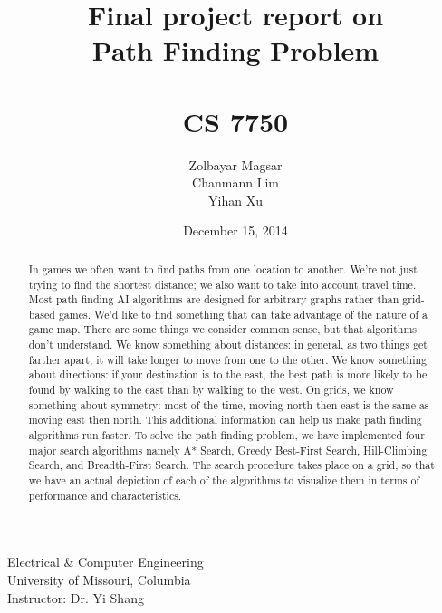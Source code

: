 \documentclass[a4paper]{article}
\title{Final project report on \\Path Finding Problem \\~ \\ CS 7750} %
\author{Zolbayar Magsar \\Chanmann Lim \\Yihan Xu}
\date{December 15, 2014}
\begin{document}
\maketitle %

\lstset{language=Java,title=\lstname,basicstyle=\footnotesize}

\begin{center}
Electrical \& Computer Engineering \\
University of Missouri, Columbia \\
\vspace{.5 in}
Instructor: Dr. Yi Shang \\
\end{center}

\vspace{1 in}

\begin{abstract}
In games we often want to find paths from one location to another. We’re not just trying to find the shortest distance; we also want to take into account travel time. Most path finding AI algorithms are designed for arbitrary graphs rather than grid-based games. We’d like to find something that can take advantage of the nature of a game map. There are some things we consider common sense, but that algorithms don’t understand. We know something about distances: in general, as two things get farther apart, it will take longer to move from one to the other. We know something about directions: if your destination is to the east, the best path is more likely to be found by walking to the east than by walking to the west. On grids, we know something about symmetry: most of the time, moving north then east is the same as moving east then north. This additional information can help us make path finding algorithms run faster. 
To solve the path finding problem, we have implemented four major search algorithms namely A* Search, Greedy Best-First Search, Hill-Climbing Search, and Breadth-First Search. The search procedure takes place on a grid, so that we have an actual depiction of each of the algorithms to visualize them in terms of performance and characteristics.
\end{abstract}


\end{document}
